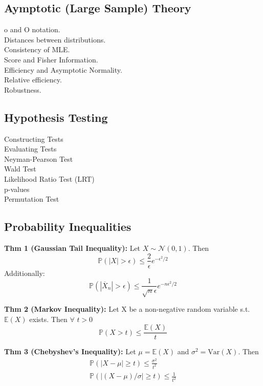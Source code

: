 \documentclass[10pt,twocolumn]{article}
\begin{document}
\subsection*{Aymptotic (Large Sample) Theory}
o and O notation.\\
Distances between distributions.\\
Consistency of MLE.\\
Score and Fisher Information.\\
Efficiency and Asymptotic Normality.\\
Relative efficiency.\\
Robustness.\\

\subsection*{Hypothesis Testing}
Constructing Tests\\
Evaluating Tests\\
Neyman-Pearson Test\\
Wald Test\\
Likelihood Ratio Test (LRT)\\
p-values\\
Permutation Test\\

\subsection*{Probability Inequalities}
\textbf{Thm 1 (Gaussian Tail Inequality):}
Let $X \sim \mathcal{N}(0,1)$. Then
\begin{equation}
    \mathbb{P}(|X| > \epsilon) \leq \frac{2}{\epsilon}e^{-\epsilon^{2}/2}
\end{equation}
Additionally:
\begin{equation}
\mathbb{P}(|\overline{X}_{n}| > \epsilon) \leq \frac{1}{\sqrt{n}\epsilon}e^{-n\epsilon^{2}/2}
\end{equation}
    
\textbf{Thm 2 (Markov Inequality):}
Let X be a non-negative random variable s.t. $\mathbb{E}(X)$ exists. Then $\forall$ $t>0$
\begin{equation}
    \mathbb{P}(X>t) \leq \frac{\mathbb{E}(X)}{t}
\end{equation}

\textbf{Thm 3 (Chebyshev's Inequality):}
Let $\mu = \mathbb{E}(X)$ and $\sigma^{2} = \text{Var}(X)$. Then
\begin{gather}
    \mathbb{P}(|X-\mu| \geq t) \leq \frac{\sigma^{2}}{t^{2}} \\
    \mathbb{P}(|(X-\mu)/\sigma| \geq t) \leq \frac{1}{t^{2}}
\end{gather}
\end{document}
